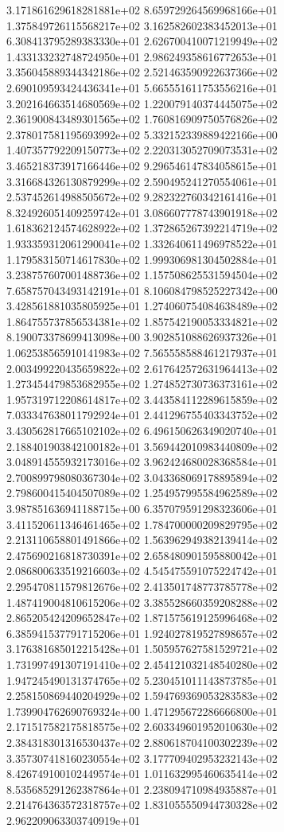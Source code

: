 3.171861629618281881e+02 8.659729264569968166e+01 1.375849726115568217e+02
3.162582602383452013e+01 6.308413795289383330e+01 2.626700410071219949e+02
1.433133232748724950e+01 2.986249358616772653e+01 3.356045889344342186e+02
2.521463590922637366e+02 2.690109593424436341e+01 5.665551611753556216e+01
3.202164663514680569e+02 1.220079140374445075e+02 2.361900843489301565e+02
1.760816909750576826e+02 2.378017581195693992e+02 5.332152339889422166e+00
1.407357792209150773e+02 2.220313052709073531e+02 3.465218373917166446e+02
9.296546147834058615e+01 3.316684326130879299e+02 2.590495241270554061e+01
2.537452614988505672e+02 9.282322760342161416e+01 8.324926051409259742e+01
3.086607778743901918e+02 1.618362124574628922e+02 1.372865267392214719e+02
1.933359312061290041e+02 1.332640611496978522e+01 1.179583150714617830e+02
1.999306981304502884e+01 3.238757607001488736e+02 1.157508625531594504e+02
7.658757043493142191e+01 8.106084798525227342e+00 3.428561881035805925e+01
1.274060754084638489e+02 1.864755737856534381e+02 1.857542190053334821e+02
8.190073378699413098e+00 3.902851088626937326e+01 1.062538565910141983e+02
7.565558588461217937e+01 2.003499220435659822e+02 2.617642572631964413e+02
1.273454479853682955e+02 1.274852730736373161e+02 1.957319712208614817e+02
3.443584112289615859e+02 7.033347638011792924e+01 2.441296755403343752e+02
3.430562817665102102e+02 6.496150626349020740e+01 2.188401903842100182e+01
3.569442010983440809e+02 3.048914555932173016e+02 3.962424680028368584e+01
2.700899798080367304e+02 3.043368069178895894e+02 2.798600415404507089e+02
1.254957995584962589e+02 3.987851636941188715e+00 6.357079591298323606e+01
3.411520611346461465e+02 1.784700000209829795e+02 2.213110658801491866e+02
1.563962949382139414e+02 2.475690216818730391e+02 2.658480901595880042e+01
2.086800633519216603e+02 4.545475591075224742e+01 2.295470811579812676e+02
2.413501748773785778e+02 1.487419004810615206e+02 3.385528660359208288e+02
2.865205424209652847e+02 1.871575619125996468e+02 6.385941537791715206e+01
1.924027819527898657e+02 3.176381685012215428e+01 1.505957627581529721e+02
1.731997491307191410e+02 2.454121032148540280e+02 1.947245490131374765e+02
5.230451011143873785e+01 2.258150869440204929e+02 1.594769369053283583e+02
1.739904762690769324e+00 1.471295672286666800e+01 2.171517582175818575e+02
2.603349601952010630e+02 2.384318301316530437e+02 2.880618704100302239e+02
3.357307418160230554e+02 3.177709402953232143e+02 8.426749100102449574e+01
1.011632995460635414e+02 8.535685291262387864e+01 2.238094710984935887e+01
2.214764363572318757e+02 1.831055550944730328e+02 2.962209063303740919e+01
